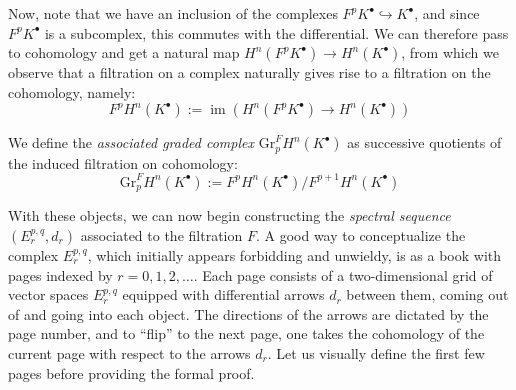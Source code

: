 \documentclass[11pt]{article}
\newcommand{\image}{\operatorname{im}}
\theoremstyle{definition}
\numberwithin{theorem}{section} %
\numberwithin{equation}{section} %
\begin{document}
\noindent Now, note that we have an inclusion of the complexes $F^pK^\bullet \hookrightarrow K^\bullet$, and since $F^pK^\bullet$ is a subcomplex, this commutes with the differential. We can therefore pass to cohomology and get a natural map $H^n\left(F^pK^\bullet\right) \to H^n\left(K^\bullet\right)$, from which we observe that a filtration on a complex naturally gives rise to a filtration on the cohomology, namely:
$$
F^pH^n\left(K^\bullet\right):= \image \left(H^n\left(F^pK^\bullet\right) \to H^n\left(K^\bullet\right)\right)
$$

\begin{definition}
    We define the \emph{associated graded complex} $\mathrm{Gr}_p^F H^n\left(K^\bullet\right)$ as successive quotients of the induced filtration on cohomology:
    $$
    \mathrm{Gr}_p^F H^n\left(K^\bullet\right) := F^pH^n\left(K^\bullet\right)/F^{p+1}H^n\left(K^\bullet\right)
    $$
\end{definition}

\noindent With these objects, we can now begin constructing the \emph{spectral sequence} $\left(E_r^{p,q}, d_r\right)$ associated to the filtration $F$. A good way to conceptualize the complex $E_r^{p,q}$, which initially appears forbidding and unwieldy, is as a book with pages indexed by $r=0,1,2,\ldots$. Each page consists of a two-dimensional grid of vector spaces $E_r^{p,q}$ equipped with differential arrows $d_r$ between them, coming out of and going into each object. The directions of the arrows are dictated by the page number, and to ``flip'' to the next page, one takes the cohomology of the current page with respect to the arrows $d_r$. Let us visually define the first few pages before providing the formal proof.
\end{document}
